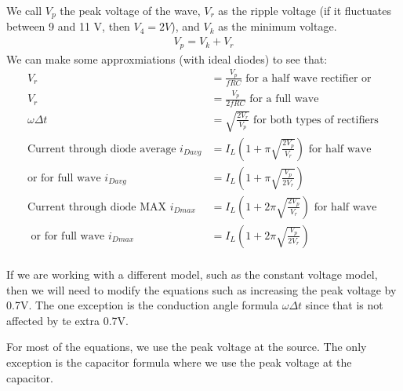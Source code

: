 \documentclass[12pt,letterpaper]{article} \usepackage{amsmath} \usepackage{graphicx} \usepackage[margin=1in]{geometry} \usepackage{longtable}  \usepackage{amssymb}
\begin{document}
	We call $V_p$ the peak voltage of the wave, $V_r$ as the ripple voltage (if it fluctuates between 9 and 11 V, then $V_4=2V$), and $V_k$ as the minimum voltage.
	\begin{align*}
		V_p = V_k + V_r
	\end{align*}
	We can make some approxmiations (with ideal diodes) to see that:
	\begin{align*}
		V_r &= \frac{V_p}{fRC} \text{ for a half wave rectifier or } \\
		V_r &= \frac{V_p}{2fRC} \text{ for a full wave }\\
		\omega\Delta t &= \sqrt{\frac{2V_r}{V_p}} \text{ for both types of rectifiers}\\
		\text{Current through diode average }i_{Davg} &= I_L(1+\pi\sqrt{\frac{2V_p}{V_r}}) \text { for half wave} \\ 
		\text{or for full wave } i_{Davg} &= I_L (1+\pi\sqrt{\frac{V_p}{2V_r}}) \\
		\text{Current through diode MAX }i_{Dmax} &= I_L(1+2\pi\sqrt{\frac{2V_p}{V_r}}) \text{ for half wave }\\ 
		\text { or for full wave } i_{Dmax} &= I_L (1+2\pi\sqrt{\frac{V_p}{2V_r}}) \\
	\end{align*}

	If we are working with a different model, such as the constant voltage model, then we will need to modify the equations such as increasing the peak voltage by 0.7V. The one exception is the conduction angle formula $\omega \Delta t$ since that is not affected by te extra 0.7V.
	
	For most of the equations, we use the peak voltage at the source. The only exception is the capacitor formula where we use the peak voltage at the capacitor. 
	
\end{document}
